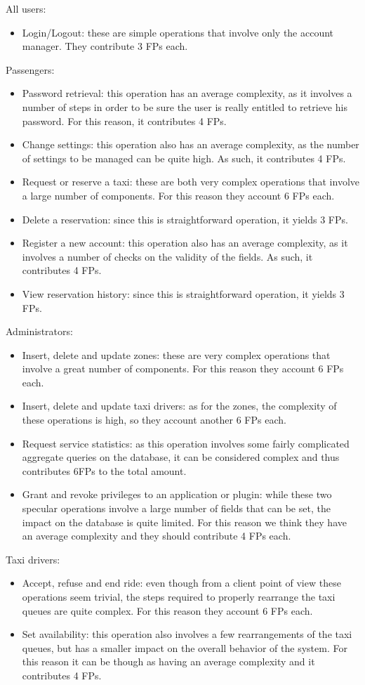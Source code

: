 All users:
\begin{itemize}
	\item Login/Logout: these are simple operations that involve only the account manager. They contribute 3 FPs each.
\end{itemize}
Passengers:
\begin{itemize}
	\item Password retrieval: this operation has an average complexity, as it involves a number of steps in order to be sure the user is really entitled to retrieve his password. For this reason, it contributes 4 FPs.
	\item Change settings: this operation also has an average complexity, as the number of settings to be managed can be quite high. As such, it contributes 4 FPs.
	\item Request or reserve a taxi: these are both very complex operations that involve a large number of components. For this reason they account 6 FPs each.
	\item Delete a reservation: since this is straightforward operation, it yields 3 FPs. 
	\item Register a new account: this operation also has an average complexity, as it involves a number of checks on the validity of the fields. As such, it contributes 4 FPs.
	\item View reservation history: since this is straightforward operation, it yields 3 FPs. 
\end{itemize}
Administrators:
\begin{itemize}
	\item Insert, delete and update zones: these are very complex operations that involve a great number of components. For this reason they account 6 FPs each.
	\item Insert, delete and update taxi drivers: as for the zones, the complexity of these operations is high, so they account another 6 FPs each. 
	\item Request service statistics: as this operation involves some fairly complicated aggregate queries on the database, it can be considered complex and thus contributes 6FPs to the total amount.
	\item Grant and revoke privileges to an application or plugin: while these two specular operations involve a large number of fields that can be set, the impact on the database is quite limited. For this reason we think they have an average complexity and they should contribute 4 FPs each.
\end{itemize}
Taxi drivers:
\begin{itemize}
	\item Accept, refuse and end ride: even though from a client point of view these operations seem trivial, the steps required to properly rearrange the taxi queues are quite complex. For this reason they account 6 FPs each.
	\item Set availability: this operation also involves a few rearrangements of the taxi queues, but has a smaller impact on the overall behavior of the system. For this reason it can be though as having an average complexity and it contributes 4 FPs.
\end{itemize}


